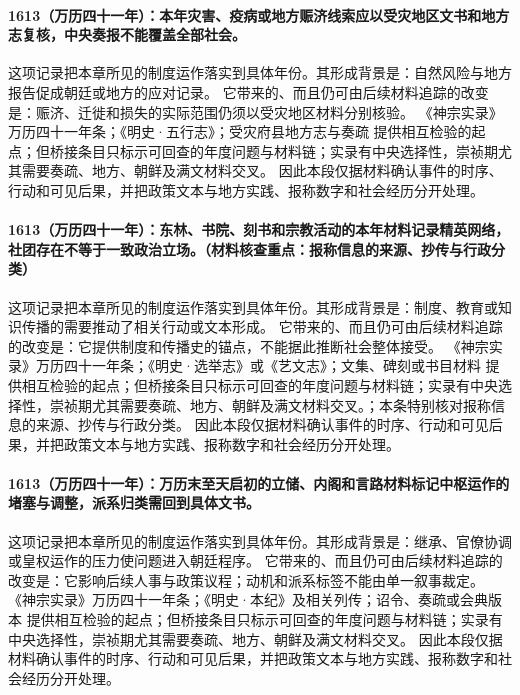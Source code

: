 \paragraph{1613（万历四十一年）：本年灾害、疫病或地方赈济线索应以受灾地区文书和地方志复核，中央奏报不能覆盖全部社会。} 这项记录把本章所见的制度运作落实到具体年份。其形成背景是：自然风险与地方报告促成朝廷或地方的应对记录。 它带来的、而且仍可由后续材料追踪的改变是：赈济、迁徙和损失的实际范围仍须以受灾地区材料分别核验。 《神宗实录》万历四十一年条；《明史·五行志》；受灾府县地方志与奏疏 提供相互检验的起点；但桥接条目只标示可回查的年度问题与材料链；实录有中央选择性，崇祯期尤其需要奏疏、地方、朝鲜及满文材料交叉。 因此本段仅据材料确认事件的时序、行动和可见后果，并把政策文本与地方实践、报称数字和社会经历分开处理。

\paragraph{1613（万历四十一年）：东林、书院、刻书和宗教活动的本年材料记录精英网络，社团存在不等于一致政治立场。（材料核查重点：报称信息的来源、抄传与行政分类）} 这项记录把本章所见的制度运作落实到具体年份。其形成背景是：制度、教育或知识传播的需要推动了相关行动或文本形成。 它带来的、而且仍可由后续材料追踪的改变是：它提供制度和传播史的锚点，不能据此推断社会整体接受。 《神宗实录》万历四十一年条；《明史·选举志》或《艺文志》；文集、碑刻或书目材料 提供相互检验的起点；但桥接条目只标示可回查的年度问题与材料链；实录有中央选择性，崇祯期尤其需要奏疏、地方、朝鲜及满文材料交叉。；本条特别核对报称信息的来源、抄传与行政分类。 因此本段仅据材料确认事件的时序、行动和可见后果，并把政策文本与地方实践、报称数字和社会经历分开处理。

\paragraph{1613（万历四十一年）：万历末至天启初的立储、内阁和言路材料标记中枢运作的堵塞与调整，派系归类需回到具体文书。} 这项记录把本章所见的制度运作落实到具体年份。其形成背景是：继承、官僚协调或皇权运作的压力使问题进入朝廷程序。 它带来的、而且仍可由后续材料追踪的改变是：它影响后续人事与政策议程；动机和派系标签不能由单一叙事裁定。 《神宗实录》万历四十一年条；《明史·本纪》及相关列传；诏令、奏疏或会典版本 提供相互检验的起点；但桥接条目只标示可回查的年度问题与材料链；实录有中央选择性，崇祯期尤其需要奏疏、地方、朝鲜及满文材料交叉。 因此本段仅据材料确认事件的时序、行动和可见后果，并把政策文本与地方实践、报称数字和社会经历分开处理。


